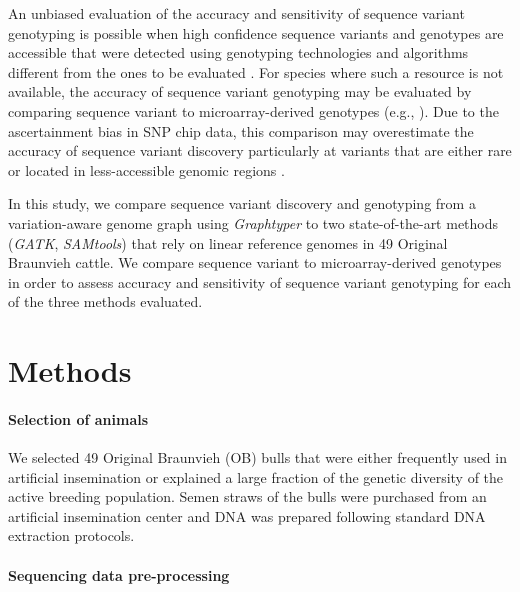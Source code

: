 \documentclass[../main.tex]{subfiles}
\begin{document}
An unbiased evaluation of the accuracy and sensitivity of sequence variant genotyping is possible when high confidence sequence variants and genotypes are accessible that were detected using genotyping technologies and algorithms different from the ones to be evaluated \citep{li2018synthetic}. For species where such a resource is not available, the accuracy of sequence variant genotyping may be evaluated by comparing sequence variant to microarray-derived genotypes (e.g., \citep{Jansen2013,depristo2011framework}). Due to the ascertainment bias in SNP chip data, this comparison may overestimate the accuracy of sequence variant discovery particularly at variants that are either rare or located in less-accessible genomic regions \citep{li2014toward,malomane2018efficiency}.

In this study, we compare sequence variant discovery and genotyping from a variation-aware genome graph using \emph{Graphtyper} to two state-of-the-art methods (\emph{GATK}, \emph{SAMtools}) that rely on linear reference genomes in 49 Original Braunvieh cattle. We compare sequence variant to microarray-derived genotypes in order to assess accuracy and sensitivity of sequence variant genotyping for each of the three methods evaluated.

\section{Methods}
\label{chap2:met}

\paragraph{Selection of animals} 

We selected 49 Original Braunvieh (OB) bulls that were either frequently used in artificial insemination or explained a large fraction of the genetic diversity of the active breeding population. Semen straws of the bulls were purchased from an artificial insemination center and DNA was prepared following standard DNA extraction protocols.

\paragraph{Sequencing data pre-processing}
\end{document}

